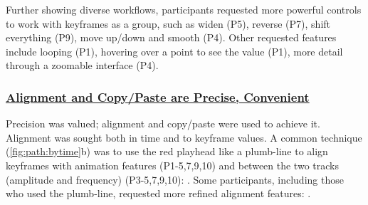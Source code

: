     Further showing diverse workflows, participants requested more powerful controls to work with keyframes as a group, such as widen (P5), reverse (P7), shift everything (P9), move up/down and smooth (P4). %
    Other requested features include looping (P1), hovering over a point to see the value (P1), more detail through a zoomable interface (P4). 

\subsubsection{\underline{Alignment and Copy/Paste are Precise, Convenient}}
    Precision was valued; alignment and copy/paste were used to achieve it.
%       
%       
    Alignment was sought both in time and to keyframe values.
    A common technique (\autoref{fig:path:bytime}b) was to use the red playhead like a plumb-line to align keyframes with animation features (P1-5,7,9,10) and between the two tracks (amplitude and frequency) (P3-5,7,9,10): .
    Some participants, including those who used the plumb-line, requested
    more refined alignment features: . %

